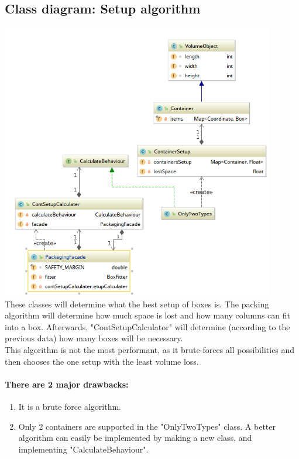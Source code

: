 \documentclass[a4paper,12pt]{article}
\begin{document}
\subsection{Class diagram: Setup algorithm}
\includegraphics[width=12cm]{Class_diagram_setup_classes.png}\\
These classes will determine what the best setup of boxes is. The packing algorithm will determine how much space is lost and how many columns can fit into a box. Afterwards, "ContSetupCalculator" will determine (according to the previous data) how many boxes will be necessary.\\

This algorithm is not the most performant, as it brute-forces all possibilities and then chooses the one setup with the least volume loss.\\

\paragraph{There are 2 major drawbacks:}
\begin{enumerate}
	\item It is a brute force algorithm.
	\item Only 2 containers are supported in the "OnlyTwoTypes" class. A better algorithm can easily be implemented by making a new class, and implementing "CalculateBehaviour". 
\end{enumerate}
\end{document}
